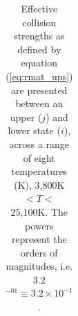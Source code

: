 \begin{table}
\begin{tabular}{c c c c c c c c c c}
 \bottomrule
 \end{tabular}
 \caption{Effective collision strengths as defined by equation (\ref{eq:rmat_ups}) are presented between an upper ($j$) and lower state ($i$), across a range of eight temperatures (K), 3,800K $ < T < $ 25,100K. The powers represent the orders of magnitudes, i.e. 3.2$^{-01}\equiv 3.2 \times 10^{-1}$. \label{tab:co_ups}}
\end{table}

